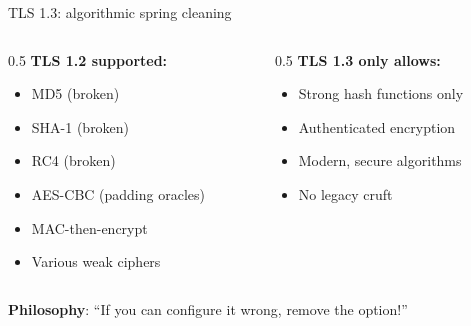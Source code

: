 \ifdefined\PRESENTATION\else\PassOptionsToClass{handout}{beamer}\fi\documentclass[aspectratio=169, lualatex]{beamer}
\begin{document}
\begin{frame}{TLS 1.3: algorithmic spring cleaning}
	\begin{columns}[c]
		\begin{column}{0.5\textwidth}
			\textbf{TLS 1.2 supported:}
			\begin{itemize}
				\item MD5 (broken)
				\item SHA-1 (broken)
				\item RC4 (broken)
				\item AES-CBC (padding oracles)
				\item MAC-then-encrypt
				\item Various weak ciphers
			\end{itemize}
		\end{column}
		\begin{column}{0.5\textwidth}
			\textbf{TLS 1.3 only allows:}
			\begin{itemize}
				\item Strong hash functions only
				\item Authenticated encryption
				\item Modern, secure algorithms
				\item No legacy cruft
			\end{itemize}
		\end{column}
	\end{columns}
	\pause
	\begin{center}
		\textbf{Philosophy}: ``If you can configure it wrong, remove the option!''
	\end{center}
\end{frame}
\end{document}
